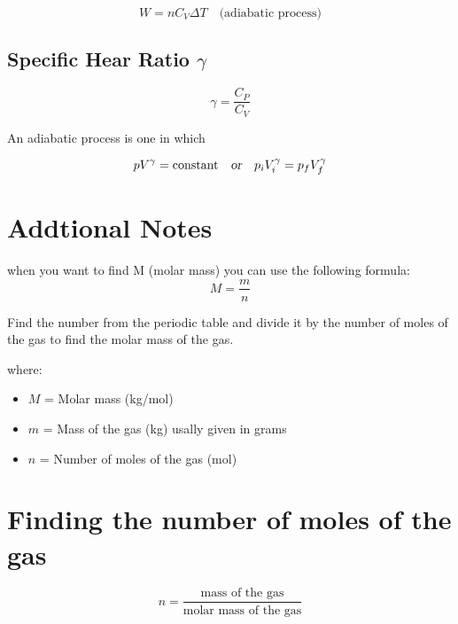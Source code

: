 \documentclass{article}
\begin{document}
\quad

\begin{tcolorbox}[colback=yellow!15, colframe=black, sharp corners, boxrule=1pt, width=\textwidth]
    \begin{equation}
       W = nC_V \Delta T \quad \text{(adiabatic process)}
    \end{equation}
\end{tcolorbox}

\subsection{Specific Hear Ratio $\gamma$}

\begin{tcolorbox}[colback = red!15, colframe=black, sharp corners, boxrule=1pt, width=\textwidth]
    \begin{equation}
        \gamma = \frac{C_P}{C_V}
    \end{equation}
\end{tcolorbox}
\quad
An adiabatic process is one in which

\begin{tcolorbox}
    \begin{equation}
        pV^\gamma = \text{constant} \quad \textsl{or} \quad p_i V_i^\gamma = p_f V_f^\gamma
    \end{equation}
\end{tcolorbox}


\section*{Addtional Notes}
when you want to find M (molar mass) you can use the following formula:
\begin{equation}
    M = \frac{m}{n}
\end{equation}

Find the number from the periodic table and divide it by the number of moles of the gas to find the molar mass of the gas.

where:
\begin{itemize}
    \item $M$ = Molar mass (kg/mol)
    \item $m$ = Mass of the gas (kg) usally given in grams
    \item $n$ = Number of moles of the gas (mol)
\end{itemize}


\section*{Finding the number of moles of the gas}
\begin{equation}
    n = \frac{\text{mass of the gas}}{\text{molar mass of the gas}}
\end{equation}
\end{document}
